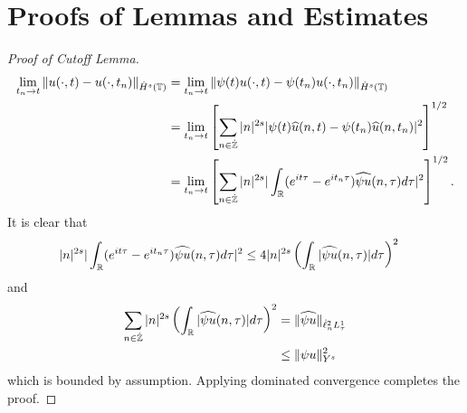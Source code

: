 \section{Proofs of Lemmas and Estimates}
\begin{proof}[Proof of Cutoff Lemma]
%
%
\begin{equation*}
	\begin{split}
		\lim_{t_{n} \to t} \|u(\cdot, t) - u(\cdot, t_{n})\|_{\dot{H}^s(\mathbb{T})} 
		& = \lim_{t_{n} \to t} \|\psi(t) u(\cdot, t) - \psi(t_n) u(\cdot,
		t_{n})\|_{\dot{H}^s(\mathbb{T})} 
		\\
		& = \lim_{t_n \to t} \left[ \sum_{n \in \dot{\mathbb{Z}}}| n |
		^{2s} | \psi(t)  \widehat{u}(n, t) - \psi(t_n) \widehat{u}(n, t_n) |^2 \right]^{1/2}
		\\
		& = \lim_{t_n \to t} \left[ \sum_{n \in \dot{\mathbb{Z}}} | n |^{2s} | \int_{\mathbb{R}} (e^{it \tau} - e^{it_{n} \tau}) \widehat{\psi u}(n,
		\tau) d \tau |^2 \right]^{1/2}.
	\end{split}
\end{equation*}
		It is clear that
		\begin{equation*}
			\begin{split}
				| n |
				^{2s} | \int_{\mathbb{R}} (e^{it \tau} - e^{it_{n}\tau}) \widehat{\psi u}(n, \tau) d \tau |^2 
		& \le 4  | n |^{2s} \left ( \int_{\mathbb{R}} |\widehat{\psi u}(n, \tau)| d \tau
		\right )^2 
	\end{split}
\end{equation*}
and 
%
%
\begin{equation*}
	\begin{split}
 \sum_{n \in \dot{\mathbb{Z}}} | n |^{2s} \left ( \int_{\mathbb{R}} |\widehat{\psi u}(n, \tau)| d \tau
		\right ) ^2 
		& = \|\widehat{\psi u}\|_{\dot{\ell}_n^2 L_\tau^1}
		\\
		& \le \|\psi u \|_{Y^s}^2 
	\end{split}
\end{equation*}
which is bounded by assumption.
Applying dominated convergence completes the proof. 
\end{proof}
%
%
%
